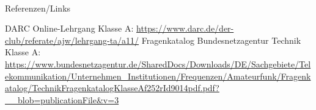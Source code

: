\renewcommand{\refname}{Referenzen}

\hypertarget{refs}{}
\textcolor{white}{} \\ %
\Large Referenzen/Links
\footnotesize

\begin{thebibliography}{}
    DARC Online-Lehrgang Klasse A:
    \url{https://www.darc.de/der-club/referate/ajw/lehrgang-ta/a11/}
     Fragenkatalog Bundesnetzagentur Technik Klasse A:\\
    \url{https://www.bundesnetzagentur.de/SharedDocs/Downloads/DE/Sachgebiete/Telekommunikation/Unternehmen_Institutionen/Frequenzen/Amateurfunk/Fragenkatalog/TechnikFragenkatalogKlasseAf252rId9014pdf.pdf?__blob=publicationFile&v=3}

\end{thebibliography}


